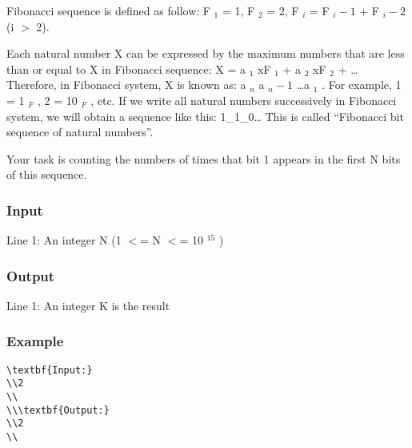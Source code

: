 



   Fibonacci sequence is defined as follow: F   $_    1   $   = 1, F   $_    2   $   = 2, F   $_    i   $   = F   $_    i-1   $   + F   $_    i-2   $   (i $>$ 2).  

   Each natural number X can be expressed by the maximum numbers that are less than or equal to X in Fibonacci sequence: X = a   $_    1   $   xF   $_    1   $   + a   $_    2   $   xF   $_    2   $   + … Therefore, in Fibonacci system, X is known as: a   $_    n   $   a   $_    n-1   $   …a   $_    1   $   . For example, 1 = 1   $_    F   $   , 2 = 10   $_    F   $   , etc. If we write all natural numbers successively in Fibonacci system, we will obtain a sequence like this: 1\_1\_0… This is called “Fibonacci bit sequence of natural numbers”.  

   Your task is counting the numbers of times that bit 1 appears in the first N bits of this sequence.  

\subsubsection{   Input  }

   Line 1: An integer N (1 $<$= N $<$= 10   $^    15   $   )  

\subsubsection{   Output  }

   Line 1: An integer K is the result  

\subsubsection{   Example  }
\begin{verbatim}
\textbf{Input:}
\\2
\\
\\\textbf{Output:}
\\2
\\\end{verbatim}
